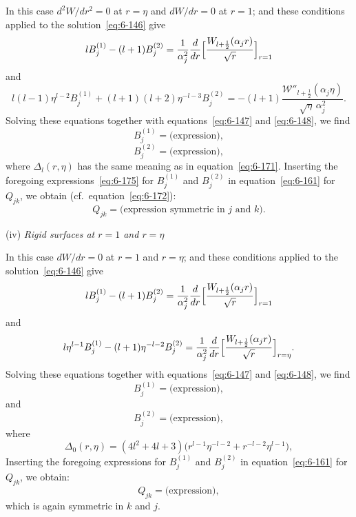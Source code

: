 In this case $d^2 W/dr^2 = 0$ at $r = \eta$ and $dW/dr = 0$ at $r = 1$; and these
conditions applied to the solution~\eqref{eq:6-146} give
\begin{equation}\label{eq:6-173}
l B_j^{(1)} - (l+1)B_j^{(2)} = \frac{1}{\alpha_j^2}\frac{d}{dr}\Bigl[\frac{\mathscr{W}_{l+\frac{1}{2}}(\alpha_j r)}{\sqrt{r}}\Bigr]_{r=1}
\end{equation}
and
\begin{equation}\label{eq:6-174}
l(l-1)\eta^{l-2}B_j^{(1)} + (l+1)(l+2)\eta^{-l-3}B_j^{(2)} = -(l+1)\frac{\mathscr{W}''_{l+\frac{1}{2}}(\alpha_j\eta)}{\sqrt{\eta}\,\alpha_j^2}.
\end{equation}
Solving these equations together with equations~\eqref{eq:6-147} and \eqref{eq:6-148}, we find
\begin{equation}\label{eq:6-175}
B_j^{(1)} = \text{(expression)},
\end{equation}
\begin{equation}\label{eq:6-176}
B_j^{(2)} = \text{(expression)},
\end{equation}
where $\Delta_l(r,\eta)$ has the same meaning as in equation~\eqref{eq:6-171}. Inserting the
foregoing expressions~\eqref{eq:6-175} for $B_j^{(1)}$ and $B_j^{(2)}$ in equation~\eqref{eq:6-161} for $Q_{jk}$, we obtain
(cf.\ equation~\eqref{eq:6-172}):
\begin{equation}\label{eq:6-177}
Q_{jk} = \text{(expression symmetric in $j$ and $k$)}.
\end{equation}

\medskip
\noindent (iv) \emph{Rigid surfaces at $r = 1$ and $r = \eta$}

In this case $dW/dr = 0$ at $r = 1$ and $r = \eta$; and these conditions
applied to the solution~\eqref{eq:6-146} give
\begin{equation}\label{eq:6-178}
l B_j^{(1)} - (l+1) B_j^{(2)} = \frac{1}{\alpha_j^2}\frac{d}{dr}\Bigl[\frac{\mathscr{W}_{l+\frac{1}{2}}(\alpha_j r)}{\sqrt{r}}\Bigr]_{r=1}
\end{equation}
and
\begin{equation}\label{eq:6-179}
l\eta^{l-1}B_j^{(1)} - (l+1)\eta^{-l-2}B_j^{(2)} = \frac{1}{\alpha_j^2}\frac{d}{dr}\Bigl[\frac{\mathscr{W}_{l+\frac{1}{2}}(\alpha_j r)}{\sqrt{r}}\Bigr]_{r=\eta}.
\end{equation}
Solving these equations together with equations~\eqref{eq:6-147} and \eqref{eq:6-148}, we find
\begin{equation}\label{eq:6-180}
B_j^{(1)} = \text{(expression)},
\end{equation}
and
\begin{equation}\label{eq:6-181}
B_j^{(2)} = \text{(expression)},
\end{equation}
where
\begin{equation}\label{eq:6-182}
\Delta_0(r,\eta) = (4l^2+4l+3)\bigl(r^{l-1}\eta^{-l-2}+r^{-l-2}\eta^{l-1}\bigr),
\end{equation}
Inserting the foregoing expressions for $B_j^{(1)}$ and $B_j^{(2)}$ in equation~\eqref{eq:6-161} for
$Q_{jk}$, we obtain:
\begin{equation}\label{eq:6-183}
Q_{jk} = \text{(expression)},
\end{equation}
which is again symmetric in $k$ and $j$.

